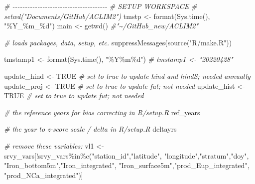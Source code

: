 \documentclass[
]{article}
\newenvironment{Shaded}{\begin{snugshade}}{\end{snugshade}}
\newcommand{\CommentTok}[1]{\textcolor[rgb]{0.56,0.35,0.01}{\textit{#1}}}
\newcommand{\ConstantTok}[1]{\textcolor[rgb]{0.00,0.00,0.00}{#1}}
\newcommand{\FunctionTok}[1]{\textcolor[rgb]{0.00,0.00,0.00}{#1}}
\newcommand{\NormalTok}[1]{#1}
\newcommand{\OtherTok}[1]{\textcolor[rgb]{0.56,0.35,0.01}{#1}}
\newcommand{\SpecialCharTok}[1]{\textcolor[rgb]{0.00,0.00,0.00}{#1}}
\newcommand{\StringTok}[1]{\textcolor[rgb]{0.31,0.60,0.02}{#1}}
\begin{document}
\begin{Shaded}
\begin{Highlighting}[]
    \CommentTok{\# {-}{-}{-}{-}{-}{-}{-}{-}{-}{-}{-}{-}{-}{-}{-}{-}{-}{-}{-}{-}{-}{-}{-}{-}{-}{-}{-}{-}{-}{-}{-}{-}{-}{-}{-}{-}{-}{-}}
    \CommentTok{\# SETUP WORKSPACE}
    \CommentTok{\# setwd("Documents/GitHub/ACLIM2")}
\NormalTok{    tmstp  }\OtherTok{\textless{}{-}} \FunctionTok{format}\NormalTok{(}\FunctionTok{Sys.time}\NormalTok{(), }\StringTok{"\%Y\_\%m\_\%d"}\NormalTok{)}
\NormalTok{    main   }\OtherTok{\textless{}{-}} \FunctionTok{getwd}\NormalTok{()  }\CommentTok{\#"\textasciitilde{}/GitHub\_new/ACLIM2"}
    
    \CommentTok{\# loads packages, data, setup, etc.}
    \FunctionTok{suppressMessages}\NormalTok{(}\FunctionTok{source}\NormalTok{(}\StringTok{"R/make.R"}\NormalTok{))}
    
\NormalTok{    tmstamp1  }\OtherTok{\textless{}{-}} \FunctionTok{format}\NormalTok{(}\FunctionTok{Sys.time}\NormalTok{(), }\StringTok{"\%Y\%m\%d"}\NormalTok{)}
    \CommentTok{\# tmstamp1  \textless{}{-} "20220428"}
    
\NormalTok{    update\_hind  }\OtherTok{\textless{}{-}} \ConstantTok{TRUE}   \CommentTok{\# set to true to update hind and hindS; needed annually}
\NormalTok{    update\_proj  }\OtherTok{\textless{}{-}} \ConstantTok{TRUE}   \CommentTok{\# set to true to update fut; not needed}
\NormalTok{    update\_hist  }\OtherTok{\textless{}{-}} \ConstantTok{TRUE}   \CommentTok{\# set to true to update fut; not needed}
     
    \CommentTok{\# the reference years for bias correcting in R/setup.R}
\NormalTok{    ref\_years }
    
    \CommentTok{\# the year to z{-}score scale / delta in R/setup.R}
\NormalTok{    deltayrs }
    
    \CommentTok{\# remove these variables:}
\NormalTok{    vl1 }\OtherTok{\textless{}{-}}\NormalTok{ srvy\_vars[}\SpecialCharTok{!}\NormalTok{srvy\_vars}\SpecialCharTok{\%in\%}\FunctionTok{c}\NormalTok{(}\StringTok{"station\_id"}\NormalTok{,}\StringTok{"latitude"}\NormalTok{,}
                                    \StringTok{"longitude"}\NormalTok{,}\StringTok{"stratum"}\NormalTok{,}\StringTok{"doy"}\NormalTok{,}
                                  \StringTok{"Iron\_bottom5m"}\NormalTok{,}\StringTok{"Iron\_integrated"}\NormalTok{,}
                                  \StringTok{"Iron\_surface5m"}\NormalTok{,}\StringTok{"prod\_Eup\_integrated"}\NormalTok{,}
                                  \StringTok{"prod\_NCa\_integrated"}\NormalTok{)]}
    

\end{Highlighting}
\end{Shaded}
\end{document}
